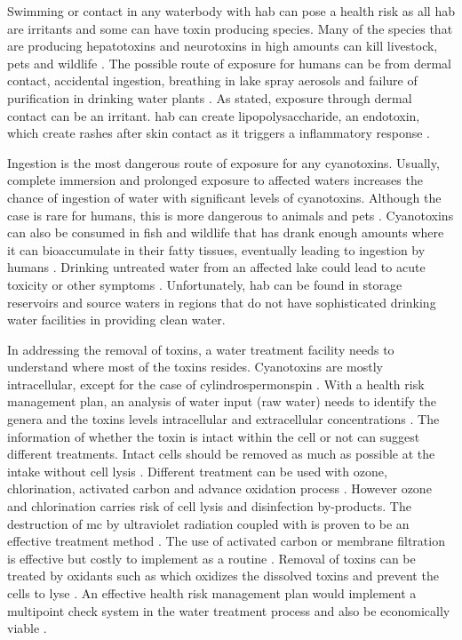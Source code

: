 Swimming or contact in any waterbody with \gls{hab} can pose a health risk as all \gls{hab} are irritants and some can have toxin producing species. Many of the species that are producing hepatotoxins and neurotoxins in high amounts can kill livestock, pets and wildlife \cite{anderson_harmful_2002}. The possible route of exposure  for humans can be from dermal contact, accidental ingestion, breathing in lake spray aerosols and failure of purification in drinking water plants \cite{may_aerosol_2018,codd_cyanobacterial_1999}. As stated, exposure through dermal contact can be an irritant. \gls{hab} can create lipopolysaccharide, an endotoxin, which create rashes after skin contact as it triggers a inflammatory response \cite{ moore_richard_cyanobacterial_1993}.

Ingestion is the most dangerous route of exposure for any cyanotoxins. Usually, complete immersion and prolonged exposure to affected waters increases the chance of ingestion of water with significant levels of cyanotoxins. Although the case is rare for humans, this is more dangerous to animals and pets \cite{koreiviene_cyanotoxin_2014}. Cyanotoxins can also be consumed in fish and wildlife that has drank enough amounts where it can bioaccumulate in their fatty tissues, eventually leading to ingestion by humans \cite{saoudi_management_2017}. Drinking untreated water from an affected lake could  lead to acute toxicity or other symptoms \cite{monks_potent_2007}. Unfortunately, \gls{hab} can be found in storage reservoirs and source waters in regions that do not have sophisticated drinking water facilities in providing clean water. 

In addressing the removal of toxins, a water treatment facility needs to understand where most of the toxins resides. Cyanotoxins are mostly intracellular, except for the case of cylindrospermonspin \cite{rastogi_cyanotoxin-microcystins:_2014}.
With a health risk management plan, an analysis of water input (raw water) needs to identify the genera and the toxins levels intracellular and extracellular concentrations \cite{saoudi_management_2017}. The information of whether the toxin is intact within the cell or not can suggest different treatments. Intact cells should be removed as much as possible at the intake without cell lysis \cite{westrick_review_2010}. Different treatment can be used with ozone, chlorination, activated carbon and advance oxidation process \cite{koreiviene_cyanotoxin_2014, westrick_cyanotoxin_2018}. However ozone and chlorination carries risk of cell lysis and disinfection by-products. The destruction of \gls{mc} by ultraviolet radiation coupled with  is proven to be an effective treatment method \cite{he_efficient_2012}. The use of activated carbon or membrane filtration is effective but costly to implement as a routine \cite{koreiviene_cyanotoxin_2014}. Removal of toxins can be treated by oxidants such as  which oxidizes the dissolved toxins and prevent the cells to lyse \cite{westrick_cyanotoxin_2018}. An effective health risk management plan would implement a multipoint check system in the water treatment process and also be economically viable \cite{westrick_review_2010,saoudi_management_2017}.

